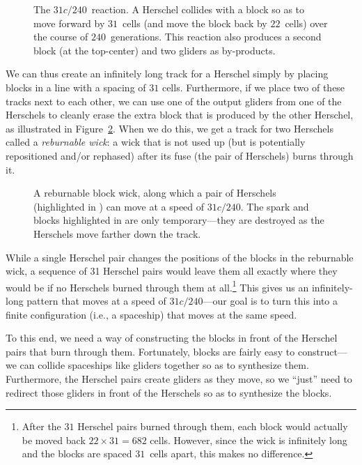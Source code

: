 \begin{figure}[!htb]
	\centering{}
	\caption{The $31c/240$~reaction. A Herschel collides with a block so as to move forward by $31$~cells (and move the block back by $22$~cells) over the course of $240$~generations. This reaction also produces a second block (at the top-center) and two gliders as by-products.}\label{fig:31c_240_reaction}
\end{figure}

We can thus create an infinitely long track for a Herschel simply by placing blocks in a line with a spacing of $31$ cells. Furthermore, if we place two of these tracks next to each other, we can use one of the output gliders from one of the Herschels to cleanly erase the extra block that is produced by the other Herschel, as illustrated in Figure~\ref{fig:31c_240_herschel_pair}. When we do this, we get a track for two Herschels called a \emph{reburnable wick}: a wick that is not used up (but is potentially repositioned and/or rephased) after its fuse (the pair of Herschels) burns through it.

\begin{figure}[!htb]
	\centering
	\caption{A reburnable block wick, along which a pair of Herschels (highlighted in ) can move at a speed of $31c/240$. The spark and blocks highlighted in  are only temporary---they are destroyed as the Herschels move farther down the track.}\label{fig:31c_240_herschel_pair}
\end{figure}

While a single Herschel pair changes the positions of the blocks in the reburnable wick, a sequence of 31 Herschel pairs would leave them all exactly where they would be if no Herschels burned through them at all.\footnote{After the $31$ Herschel pairs burned through them, each block would actually be moved back $22 \times 31 = 682$ cells. However, since the wick is infinitely long and the blocks are spaced $31$~cells apart, this makes no difference.} This gives us an infinitely-long pattern that moves at a speed of $31c/240$---our goal is to turn this into a finite configuration (i.e., a spaceship) that moves at the same speed.

To this end, we need a way of constructing the blocks in front of the Herschel pairs that burn through them. Fortunately, blocks are fairly easy to construct---we can collide spaceships like gliders together so as to synthesize them. Furthermore, the Herschel pairs create gliders as they move, so we ``just'' need to redirect those gliders in front of the Herschels so as to synthesize the blocks.

